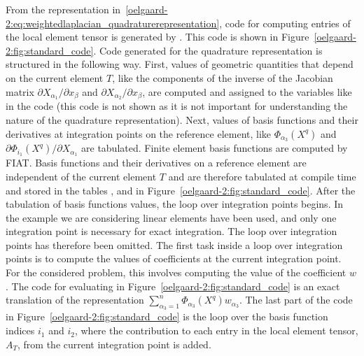 From the representation
in~\eqref{oelgaard-2:eq:weightedlaplacian_quadraturerepresentation},
code for computing entries of the local element tensor is generated by
\ffc{}. This code is shown in Figure~\ref{oelgaard-2:fig:standard_code}.
Code generated for the quadrature representation is structured in the
following way.  First, values of geometric quantities that depend on
the current element $T$, like the components of the inverse of the
Jacobian matrix
$\partial X_{\alpha_1} / \partial x_{\beta}$ and
$\partial X_{\alpha_2} / \partial x_{\beta}$,
are computed and assigned to the variables like  in the code
(this code is not shown as it is not important for understanding the
nature of the quadrature representation).  Next, values of basis functions
and their derivatives at integration points on the reference element,
like $\Phi_{\alpha_{3}}(X^q)$ and $\partial \Phi_{i_1}(X^q) / \partial
X_{\alpha_1}$ are tabulated.  Finite element basis functions are computed
by FIAT.  Basis functions and their derivatives on a reference element
are independent of the current element $T$ and are therefore tabulated at
compile time and stored in the tables ,  and
 in Figure~\ref{oelgaard-2:fig:standard_code}.  After
the tabulation of basis functions values, the loop over integration points
begins.  In the example we are considering linear elements have been used,
and only one integration point is necessary for exact integration. The
loop over integration points has therefore been omitted.  The first
task inside a loop over integration points is to compute the values
of coefficients at the current integration point.  For the considered
problem, this involves computing the value of the coefficient $w$.  The
code for evaluating  in Figure~\ref{oelgaard-2:fig:standard_code}
is an exact translation of the representation $\sum_{\alpha_{3}=1}^n
\Phi_{\alpha_{3}}(X^q) w_{\alpha_{3}}$.  The last part of the code in
Figure~\ref{oelgaard-2:fig:standard_code} is the loop over the basis
function indices $i_{1}$ and $i_{2}$, where the contribution to each
entry in the local element tensor, $A_{T}$, from the current integration
point is added.
%
